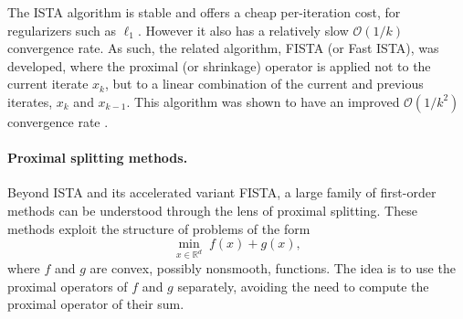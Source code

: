 \documentclass[11pt, twoside]{report}
\newtheorem{lemma}[theorem]{Lemma}
\begin{document}

The ISTA algorithm is stable and offers a cheap per-iteration cost, for regularizers such as $\ell_1$. However it also has a relatively slow $\mathcal{O}(1/k)$ convergence rate. As such, the related algorithm, FISTA (or Fast ISTA), was developed, where the proximal (or shrinkage) operator is applied not to the current iterate $x_k$, but to a linear combination of the current and previous iterates, $x_k$ and $x_{k-1}$. This algorithm was shown to have an improved $\mathcal{O}(1/k^2)$ convergence rate \cite{beck2009fista}.

\paragraph{Proximal splitting methods.} 
Beyond ISTA and its accelerated variant FISTA, a large family of first-order methods can be understood through the lens of proximal splitting. These methods exploit the structure of problems of the form
\[
    \min_{x \in \mathbb{R}^d} \; f(x) + g(x),
\]
where $f$ and $g$ are convex, possibly nonsmooth, functions. The idea is to use the proximal operators of $f$ and $g$ separately, avoiding the need to compute the proximal operator of their sum.
\end{document}
